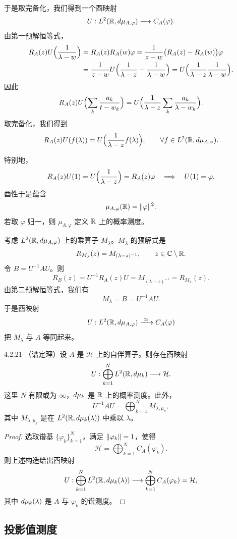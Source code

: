 于是取完备化，我们得到一个酉映射
\[
U:L^2(\mathbb{R},d\mu_{A,\varphi})\longrightarrow C_A(\varphi).
\]
由第一预解恒等式，
\[
\begin{aligned}
R_A(z)U\Bigl(\frac{1}{\lambda-w}\Bigr)
&=R_A(z)R_A(w)\varphi
=\frac{1}{z-w}\bigl(R_A(z)-R_A(w)\bigr)\varphi\\
&=\frac{1}{z-w}U\Bigl(\frac{1}{\lambda-z}-\frac{1}{\lambda-w}\Bigr)
=U\Bigl(\frac{1}{\lambda-z}\frac{1}{\lambda-w}\Bigr).
\end{aligned}
\]
因此
\[
R_A(z)U\Bigl(\sum_k\frac{a_k}{t-w_k}\Bigr)
=U\Bigl(\frac{1}{\lambda-z}\sum_k\frac{a_k}{\lambda-w_k}\Bigr).
\]
取完备化，我们得到
\[
R_A(z)U(f(\lambda))=U\Bigl(\frac{1}{\lambda-z}f(\lambda)\Bigr),
\qquad\forall f\in L^2(\mathbb{R},d\mu_{A,\varphi}).
\]

特别地，
\[
R_A(z)U(1)=U\Bigl(\frac{1}{\lambda-z}\Bigr)=R_A(z)\varphi
\quad\Longrightarrow\quad
U(1)=\varphi.
\]
酉性于是蕴含
\[
\mu_{A,\varphi}(\mathbb{R})=\lVert \varphi\rVert^2.
\]
若取 $\varphi$ 归一，则 $\mu_{A,\varphi}$ 定义 $\mathbb{R}$ 上的概率测度。

考虑 $L^2(\mathbb{R},d\mu_{A,\varphi})$ 上的乘算子 $M_\lambda$。$M_\lambda$ 的预解式是
\[
R_{M_\lambda}(z)=M_{(\lambda-z)^{-1}},\qquad z\in\mathbb{C}\setminus\mathbb{R}.
\]
令 $B=U^{-1}AU$。则
\[
R_B(z)=U^{-1}R_A(z)U=M_{(\lambda-z)^{-1}}=R_{M_\lambda}(z).
\]
由第二预解恒等式，我们有
\[
M_\lambda=B=U^{-1}AU.
\]
于是酉映射
\[
U:L^2(\R,\rd\mu_{A,\varphi})\xrightarrow{\ \simeq\ }C_A(\varphi)
\]
把 $M_\lambda$ 与 $A$ 等同起来。

\begin{theorem}{4.2.21}
  （谱定理）设 $A$ 是 $\mathcal{H}$ 上的自伴算子。则存在酉映射
  \[
  U:\bigoplus_{k=1}^{N}L^2(\mathbb{R},d\mu_k)\longrightarrow\mathcal{H}.
  \]
  这里 $N$ 有限或为 $\infty$，$d\mu_k$ 是 $\mathbb{R}$ 上的概率测度。此外，
  \[
  U^{-1}AU=\bigoplus_{k=1}^{N}M_{\lambda,\mu_k},
  \]
  其中 $M_{\lambda,\mu_k}$ 是在 $L^2(\mathbb{R},d\mu_k(\lambda))$ 中乘以 $\lambda$。
\end{theorem}

\begin{proof}
  选取谱基 $\{\varphi_k\}_{k=1}^{N}$，满足 $\lVert \varphi_k\rVert=1$，使得
  \[
  \mathcal{H}=\bigoplus_{k=1}^{N}C_A(\varphi_k).
  \]
  则上述构造给出酉映射
  \[
  U:\bigoplus_{k=1}^{N}L^2(\mathbb{R},d\mu_k(\lambda))
  \longrightarrow\bigoplus_{k=1}^{N}C_A(\varphi_k)=\mathcal{H},
  \]
  其中 $d\mu_k(\lambda)$ 是 $A$ 与 $\varphi_k$ 的谱测度。
\end{proof}

\subsection{投影值测度}

